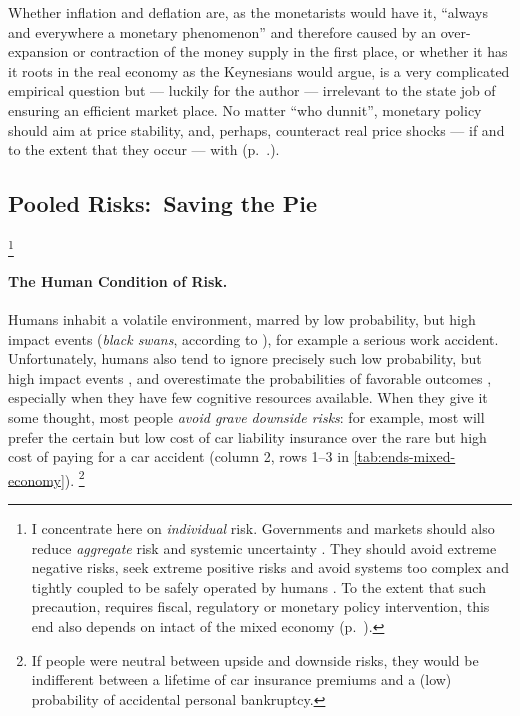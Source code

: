 Whether inflation and deflation are, as the monetarists would have it, ``always and everywhere a monetary phenomenon'' \citep{Friedman1970}
and therefore caused by an over-expansion or contraction of the money supply in the first place, or whether it has it roots in the real economy as the Keynesians would argue, is a very complicated empirical question but --- luckily for the author --- irrelevant to the state job of ensuring an efficient market place.
No matter ``who dunnit'', monetary policy should aim at price stability, and, perhaps, counteract real price shocks --- if and to the extent that they occur --- with  (p.~\pageref{sec:monetary-stimulus}.).%

\subsection[Pooled Risks]{Pooled Risks:\ Saving the Pie}
	\label{sec:risk}
\footnote{
	I concentrate here on \emph{individual} risk.
	Governments and markets should also reduce \emph{aggregate} risk and systemic uncertainty \citep{Knight1921}.
	They should avoid extreme negative risks, seek extreme positive risks \citep{Taleb2007} and avoid systems too complex and tightly coupled to be safely operated by humans \citep{Perrow-1999-aa}.
	To the extent that such precaution, requires fiscal, regulatory or monetary policy intervention, this end also depends on intact  of the mixed economy (p.~\pageref{sec:means}).
}

\paragraph{The Human Condition of Risk.}
	\label{sec:human-nature-of-risk} Humans inhabit a volatile environment, marred by low probability, but high impact events (\emph{black swans}, according to \citealt{Taleb2007}), for example a serious work accident.
Unfortunately, humans also tend to ignore precisely such low probability, but high impact events \citep{Taleb2007}, and overestimate the probabilities of favorable outcomes \citep[44]{Baron2000}, especially when they have few cognitive resources available.
When they give it some thought, most people \emph{avoid grave downside risks}:
for example, most will prefer the certain but low cost of car liability insurance over the rare but high cost of paying for a car accident (column 2, rows 1--3 in \autoref{tab:ends-mixed-economy}).
\footnote{
	If people were neutral between upside and downside risks, they would be indifferent between a lifetime of car insurance premiums and a (low) probability of accidental personal bankruptcy.
}


